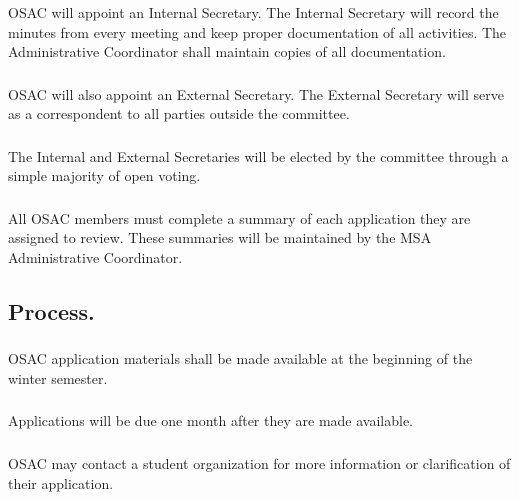 \subsubsection{}
OSAC will appoint an Internal Secretary.  The Internal Secretary will record the minutes from every meeting and keep proper documentation of all activities.  The Administrative Coordinator shall maintain copies of all documentation.

\subsubsection{}
OSAC will also appoint an External Secretary.  The External Secretary will serve as a correspondent to all parties outside the committee.

\subsubsection{}
The Internal and External Secretaries will be elected by the committee through a simple majority of open voting.

\subsubsection{}
All OSAC members must complete a summary of each application they are assigned to review.  These summaries will be maintained by the MSA Administrative Coordinator.


\subsection{Process.}

\subsubsection{}
OSAC application materials shall be made available at the beginning of the winter semester.  

\subsubsection{}
Applications will be due one month after they are made available.

\subsubsection{}
OSAC may contact a student organization for more information or clarification of their application.

